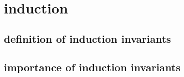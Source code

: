 \section{induction}
\subsection{definition of induction invariants}
\subsection{importance of induction invariants}
